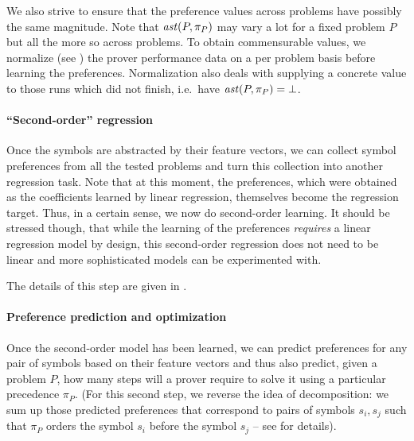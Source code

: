 \documentclass{ceurart}
\begin{document}
We also strive to ensure that the preference values across problems have possibly the same magnitude.
Note that \(\operatorname{\mathit{ast}}(P,\pi_P)\) may vary a lot for a fixed problem \(P\) but all the more so across
problems. To obtain commensurable values, we normalize
(see ) the prover performance data
on a per problem basis before learning the preferences. Normalization also deals with
supplying a concrete value to those runs which did not finish, i.e.~have \(\operatorname{\mathit{ast}}(P,\pi_P) = \bot\).


\paragraph{``Second-order'' regression}
Once the symbols are abstracted by their feature vectors, we can collect symbol preferences from all the tested problems
and turn this collection into another regression task. 
Note that at this moment, the preferences, which were obtained as the coefficients learned by linear regression,
themselves become the regression target. Thus, in a certain sense, we now do second-order learning.
It should be stressed though, that while the learning of the preferences \emph{requires} a linear regression model by design,
this second-order regression does not need to be linear and more sophisticated models can be experimented with. 

The details of this step are given in .

\paragraph{Preference prediction and optimization} Once the second-order model has been learned, we can predict 
preferences for any pair of symbols based on their feature vectors and thus also predict,
given a problem $P$, how many steps will a prover require to solve it using a particular precedence $\pi_P$.
(For this second step, we reverse the idea of decomposition:
we sum up those predicted preferences that correspond to pairs of symbols $s_i,s_j$
such that $\pi_P$ orders the symbol $s_i$ before the symbol $s_j$ -- see  for details).
\end{document}
